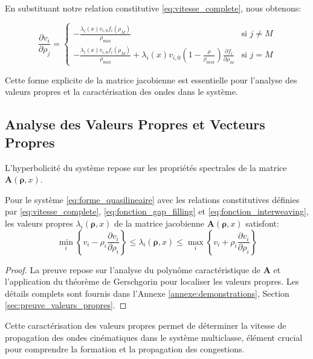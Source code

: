 En substituant notre relation constitutive \eqref{eq:vitesse_complete}, nous obtenons:

\begin{equation}
\frac{\partial v_i}{\partial \rho_j} = 
\begin{cases}
-\frac{\lambda_i(x) v_{i,0} f_i(\rho_M)}{\rho_{\max}} & \text{si } j \neq M \\
-\frac{\lambda_i(x) v_{i,0} f_i(\rho_M)}{\rho_{\max}} + \lambda_i(x) v_{i,0} \left(1 - \frac{\rho}{\rho_{\max}}\right) \frac{\partial f_i}{\partial \rho_M} & \text{si } j = M
\end{cases}
\end{equation}

Cette forme explicite de la matrice jacobienne est essentielle pour l'analyse des valeurs propres et la caractérisation des ondes dans le système.

\subsection{Analyse des Valeurs Propres et Vecteurs Propres}
\label{subsec:valeurs_propres}

L'hyperbolicité du système repose sur les propriétés spectrales de la matrice $\mathbf{A}(\boldsymbol{\rho}, x)$.

\begin{theorem}
Pour le système \eqref{eq:forme_quasilineaire} avec les relations constitutives définies par \eqref{eq:vitesse_complete}, \eqref{eq:fonction_gap_filling} et \eqref{eq:fonction_interweaving}, les valeurs propres $\lambda_i(\boldsymbol{\rho}, x)$ de la matrice jacobienne $\mathbf{A}(\boldsymbol{\rho}, x)$ satisfont:
\begin{equation}
\min_{i} \left\{v_i - \rho_i \frac{\partial v_i}{\partial \rho_i}\right\} \leq \lambda_i(\boldsymbol{\rho}, x) \leq \max_{i} \left\{v_i + \rho_i \frac{\partial v_i}{\partial \rho_i}\right\}
\end{equation}
\end{theorem}

\begin{proof}
La preuve repose sur l'analyse du polynôme caractéristique de $\mathbf{A}$ et l'application du théorème de Gerschgorin pour localiser les valeurs propres. Les détails complets sont fournis dans l'Annexe \ref{annexe:demonstrations}, Section \ref{sec:preuve_valeurs_propres}.
\end{proof}

Cette caractérisation des valeurs propres permet de déterminer la vitesse de propagation des ondes cinématiques dans le système multiclasse, élément crucial pour comprendre la formation et la propagation des congestions.

